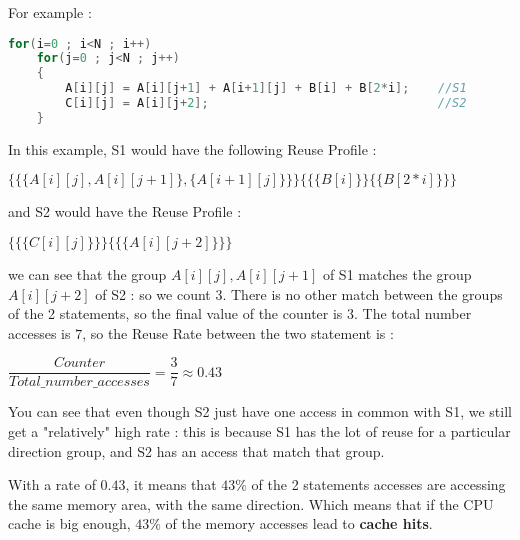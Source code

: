 \documentclass[paper=a4, fontsize=11pt]{scrartcl}
\numberwithin{equation}{section}        %
\numberwithin{figure}{section}          %
\numberwithin{table}{section}               %
\begin{document}
            For example :
\begin{lstlisting}[frame=single, language=C, caption={Reuse profile rating example}, label={lst:rp_example}]
for(i=0 ; i<N ; i++)
    for(j=0 ; j<N ; j++)
    {
        A[i][j] = A[i][j+1] + A[i+1][j] + B[i] + B[2*i];    //S1
        C[i][j] = A[i][j+2];                                //S2
    }
\end{lstlisting}
        In this example, S1 would have the following Reuse Profile :
        \begin{center}$
            \{
                \{ 
                    \{A[i][j],A[i][j+1]\},
                    \{A[i+1][j]\}
                \}
            \}
            \{
                \{
                    \{B[i]\}
                \}
                \{
                    \{B[2*i]\}
                \}
            \}$
        \end{center}
            and S2 would have the Reuse Profile :
        \begin{center}$
            \{
                \{
                    \{C[i][j]\}
                \}
            \}
            \{
                \{
                    \{A[i][j+2]\}
                \}
            \}$
        \end{center}
        we can see that the group ${A[i][j],A[i][j+1]}$ of S1 matches the group ${A[i][j+2]}$
        of S2 : so we count $3$. There is no other match between the groups of the 2 statements,
        so the final value of the counter is $3$. The total number accesses is $7$, so the
        Reuse Rate between the two statement is :
        \begin{center}
            $\dfrac{\mathit{Counter}}{\mathit{Total\_number\_accesses}} = \dfrac{3}{7} \approx 0.43$
        \end{center}

        \bigskip

        You can see that even though S2 just have one access in common with S1, we still get
        a "relatively" high rate : this is because S1 has the lot of reuse for a particular
        direction group, and S2 has an access that match that group.

        With a rate of $0.43$, it means that $43\%$ of the 2 statements accesses are
        accessing the same memory area, with the same direction. Which means that if the
        CPU cache is big enough, $43\%$ of the memory accesses lead to \textbf{cache hits}.
            
\end{document}
